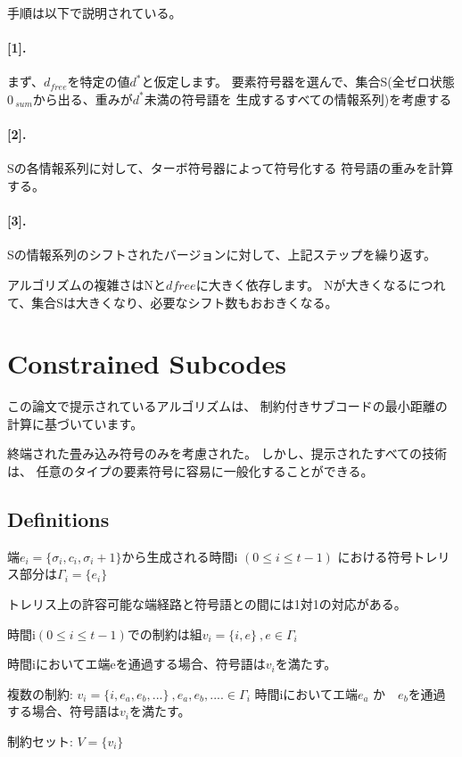 \documentclass[20 pts]{article}
\begin{document}
手順は以下で説明されている。

\paragraph{[1].} まず、$ d_ {free} $を特定の値$ d ^ * $と仮定します。 
要素符号器を選んで、集合S(全ゼロ状態$ 0 _ {\ sum} $から出る、重みが$ d ^ * $未満の符号語を
生成するすべての情報系列)を考慮する

\paragraph{[2].}Sの各情報系列に対して、ターボ符号器によって符号化する
符号語の重みを計算する。

\paragraph{[3].}Sの情報系列のシフトされたバージョンに対して、上記ステップを繰り返す。


アルゴリズムの複雑さはNと$ d {free} $に大きく依存します。
Nが大きくなるにつれて、集合Sは大きくなり、必要なシフト数もおおきくなる。

\section{Constrained Subcodes}
この論文で提示されているアルゴリズムは、
制約付きサブコードの最小距離の計算に基づいています。

終端された畳み込み符号のみを考慮された。 しかし、提示されたすべての技術は、
任意のタイプの要素符号に容易に一般化することができる。

\subsection{Definitions}
端$e_i=\{ \sigma_i, c_i,\sigma_i+1\}$から生成される時間i $(0 \leq i \leq t-1)$
における符号トレリス部分は$\Gamma_i=\{ \mathit{e}_i\}$

トレリス上の許容可能な端経路と符号語との間には1対1の対応がある。

時間i$(0 \leq i \leq t-1)$での制約は組$v_i=\{ i,e\} \ ,e \in \Gamma_i$

時間iにおいてエ端eを通過する場合、符号語は$v_i$を満たす。

複数の制約: $v_i=\{ i,e_a, e_b,...\} \ ,e_a, e_b,.... \in \Gamma_i$
時間iにおいてエ端$e_a$ か　$e_b$を通過する場合、符号語は$v_i$を満たす。

制約セット: $V=\{ \mathit{v}_i\}$ 
\end{document}
